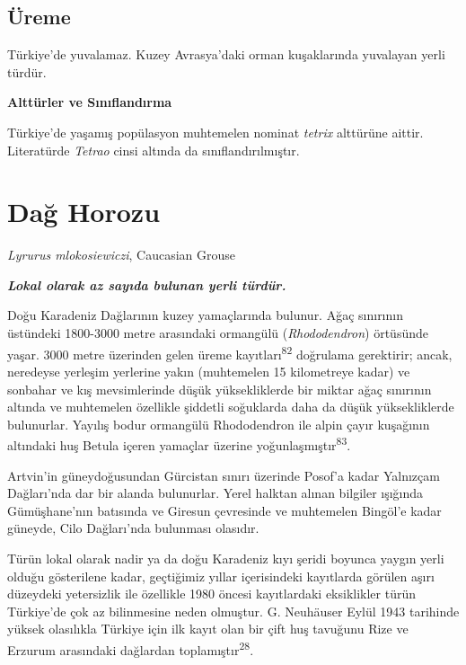 \documentclass[
  letterpaper,
  DIV=11,
  numbers=noendperiod]{scrreprt}
\begin{document}
\subsection{\texorpdfstring{\textbf{Üreme}}{Üreme}}\label{uxfcreme}

Türkiye'de yuvalamaz. Kuzey Avrasya'daki orman kuşaklarında yuvalayan
yerli türdür.

\textbf{Alttürler ve Sınıflandırma}

Türkiye'de yaşamış popülasyon muhtemelen nominat \emph{tetrix} alttürüne
aittir. Literatürde \emph{Tetrao} cinsi altında da sınıflandırılmıştır.

\section{Dağ Horozu}\label{daux11f-horozu}

\emph{Lyrurus mlokosiewiczi}, Caucasian Grouse

\textbf{\emph{Lokal olarak az sayıda bulunan yerli türdür.}}

Doğu Karadeniz Dağlarının kuzey yamaçlarında bulunur. Ağaç sınırının
üstündeki 1800-3000 metre arasındaki ormangülü (\emph{Rhododendron})
örtüsünde yaşar. 3000 metre üzerinden gelen üreme
kayıtları\textsuperscript{82} doğrulama gerektirir; ancak, neredeyse
yerleşim yerlerine yakın (muhtemelen 15 kilometreye kadar) ve sonbahar
ve kış mevsimlerinde düşük yüksekliklerde bir miktar ağaç sınırının
altında ve muhtemelen özellikle şiddetli soğuklarda daha da düşük
yüksekliklerde bulunurlar. Yayılış bodur ormangülü Rhododendron ile
alpin çayır kuşağının altındaki huş Betula içeren yamaçlar üzerine
yoğunlaşmıştır\textsuperscript{83}.

Artvin'in güneydoğusundan Gürcistan sınırı üzerinde Posof'a kadar
Yalnızçam Dağları'nda dar bir alanda bulunurlar. Yerel halktan alınan
bilgiler ışığında Gümüşhane'nın batısında ve Giresun çevresinde ve
muhtemelen Bingöl'e kadar güneyde, Cilo Dağları'nda bulunması olasıdır.

Türün lokal olarak nadir ya da doğu Karadeniz kıyı şeridi boyunca yaygın
yerli olduğu gösterilene kadar, geçtiğimiz yıllar içerisindeki
kayıtlarda görülen aşırı düzeydeki yetersizlik ile özellikle 1980 öncesi
kayıtlardaki eksiklikler türün Türkiye'de çok az bilinmesine neden
olmuştur. G. Neuhäuser Eylül 1943 tarihinde yüksek olasılıkla Türkiye
için ilk kayıt olan bir çift huş tavuğunu Rize ve Erzurum arasındaki
dağlardan toplamıştır\textsuperscript{28}.
\end{document}
